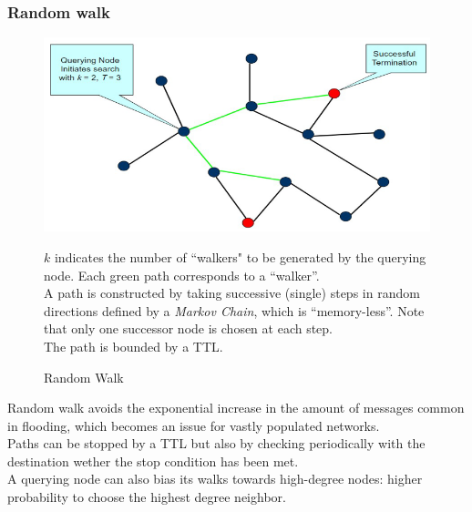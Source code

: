 \subsubsection{Random walk}

\begin{figure}[htbp]
   \centering
   \includegraphics{images/randomwalk.png}
   \caption{Random Walk}
   \label{fig:randomwalk}
   $k$ indicates the number of ``walkers" to be generated by the querying node. Each green path corresponds to a ``walker''.\\
   A path is constructed by taking successive (single) steps in random directions defined by a \textit{Markov Chain}, which is ``memory-less''.
   Note that only one successor node is chosen at each step.\\
   The path is bounded by a TTL.
\end{figure}
Random walk avoids the exponential increase in the amount of messages common in flooding, which becomes an issue for vastly populated networks.\\
Paths can be stopped by a TTL but also by checking periodically with the destination wether the stop condition has been met.\\
A querying node can also bias its walks towards high-degree nodes: higher probability to choose the highest degree neighbor.

